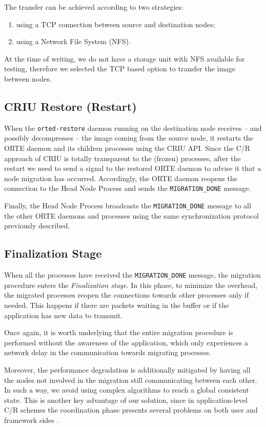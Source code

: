 The transfer can be achieved according to two strategies: 
\begin{enumerate}
\item using a TCP connection between source and destination nodes;
\item using a Network File System (NFS).
\end{enumerate}
At the time of writing, we do not have a storage unit with NFS available for
testing, therefore we selected the TCP based option to transfer the image
between nodes.


\subsection{CRIU Restore (Restart)}

When the \texttt{orted-restore} daemon running on the destination node receives
-- and possibly decompresses -- the image coming from the source node, it
restarts the ORTE daemon and its children processes using the CRIU API.
Since the C/R approach of CRIU is totally transparent to the (frozen) processes,
after the restart we need to send a signal to the restored ORTE daemon
to advise it that a node migration has occurred. Accordingly, the ORTE daemon
reopens the connection to the Head Node Process and sends the \texttt{MIGRATION\_DONE}
message.

Finally, the Head Node Process broadcasts the \texttt{MIGRATION\_DONE} message to all
the other ORTE daemons and processes using the same synchronization protocol
previously described.


\subsection{Finalization Stage}

When all the processes have received the \texttt{MIGRATION\_DONE} message, the
migration procedure enters the \emph{Finalization stage}. In this phase, to
minimize the overhead, the migrated processes reopen the connections towards
other processes only if needed. This happens if there are packets waiting in the
buffer or if the application has new data to transmit.

Once again, it is worth underlying that the entire migration procedure is
performed without the awareness of the application, which only experiences
a network delay in the communication towards migrating processes.

Moreover, the performance degradation is additionally mitigated by having all
the nodes not involved in the migration still communicating between each
other. In such a way, we avoid using complex algorithms to reach a global
consistent state. This is
another key advantage of our solution, since in application-level C/R schemes
the coordination phase presents several problems on both user and framework
sides \cite{schulz2004implementation}.

